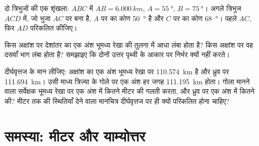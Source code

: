 \begin{exercise}[$\star\star\star$]\label{exo:g10:measuring-the-earth:13}
दो त्रिभुजों की एक शृंखला: $ABC$ में $AB = \qty{6.000}{km}$,
$A = \qty{55}{\degree}$, $B = \qty{75}{\degree}$। अगले त्रिभुज $ACD$ में,
जो भुजा $AC$ पर बना है, $A$ पर का कोण \qty{50}{\degree} है और
$C$ पर का कोण \qty{68}{\degree}। पहले $AC$, फिर $AD$ परिकलित कीजिए।
\end{exercise}

\begin{exercise}[$\star\star\star$]\label{exo:g10:measuring-the-earth:14}
किस अक्षांश पर देशांतर का एक अंश भूमध्य रेखा की तुलना में आधा लंबा होता है?
किस अक्षांश पर वह दसवाँ भाग लंबा होता है? समझाइए कि दोनों उत्तर पृथ्वी के आकार पर
निर्भर क्यों नहीं करते।
\end{exercise}

\begin{exercise}[$\star\star\star$]\label{exo:g10:measuring-the-earth:15}
दीर्घवृत्तज के मान लीजिए: अक्षांश का एक अंश भूमध्य रेखा पर \qty{110.574}{km} है और
ध्रुव पर \qty{111.694}{km}। उसी माध्य त्रिज्या के गोले पर
एक अंश हर जगह \qty{111.195}{km} होता। गोला मानने वाला सर्वेक्षक भूमध्य रेखा पर एक अंश में
कितने मीटर की गलती करता, और ध्रुव पर एक अंश में कितने की? मीटर तक की
स्थितियाँ देने वाला मानचित्र दीर्घवृत्तज पर ही क्यों परिकलित होना चाहिए?
\end{exercise}

\section{समस्या: मीटर और याम्योत्तर}


